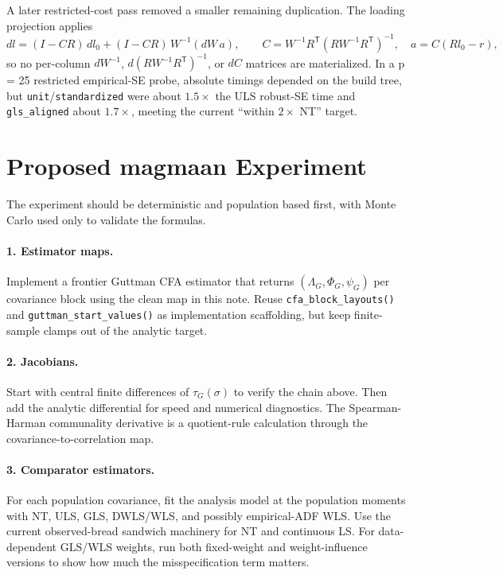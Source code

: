 \documentclass[11pt]{article}
\newcommand{\T}{^{\mathsf T}}
\theoremstyle{plain}
\theoremstyle{remark}
\begin{document}
A later restricted-cost pass removed a smaller remaining duplication. The
loading projection applies
\[
  dl = (I-CR)\,dl_0 + (I-CR)\,W^{-1}(dW\,a),\qquad
  C=W^{-1}R\T(RW^{-1}R\T)^{-1},\quad a=C(Rl_0-r),
\]
so no per-column \(dW^{-1}\), \(d(RW^{-1}R\T)^{-1}\), or \(dC\) matrices are
materialized. In a p = 25 restricted empirical-SE probe, absolute timings
depended on the build tree, but \texttt{unit}/\texttt{standardized} were about
\(1.5\times\) the ULS robust-SE time and \texttt{gls\_aligned} about
\(1.7\times\), meeting the current ``within \(2\times\) NT'' target.

\section{Proposed magmaan Experiment}

The experiment should be deterministic and population based first, with Monte
Carlo used only to validate the formulas.

\paragraph{1. Estimator maps.}
Implement a frontier Guttman CFA estimator that returns
\((\Lambda_G,\Phi_G,\psi_G)\) per covariance block using the clean map in this
note. Reuse \texttt{cfa\_block\_layouts()} and
\texttt{guttman\_start\_values()} as implementation scaffolding, but keep
finite-sample clamps out of the analytic target.

\paragraph{2. Jacobians.}
Start with central finite differences of \(\tau_G(\sigma)\) to verify the
chain above. Then add the analytic differential for speed and numerical
diagnostics. The Spearman-Harman communality derivative is a quotient-rule
calculation through the covariance-to-correlation map.

\paragraph{3. Comparator estimators.}
For each population covariance, fit the analysis model at the population
moments with NT, ULS, GLS, DWLS/WLS, and possibly empirical-ADF WLS. Use the
current observed-bread sandwich machinery for NT and continuous LS. For
data-dependent GLS/WLS weights, run both fixed-weight and weight-influence
versions to show how much the misspecification term matters.
\end{document}

